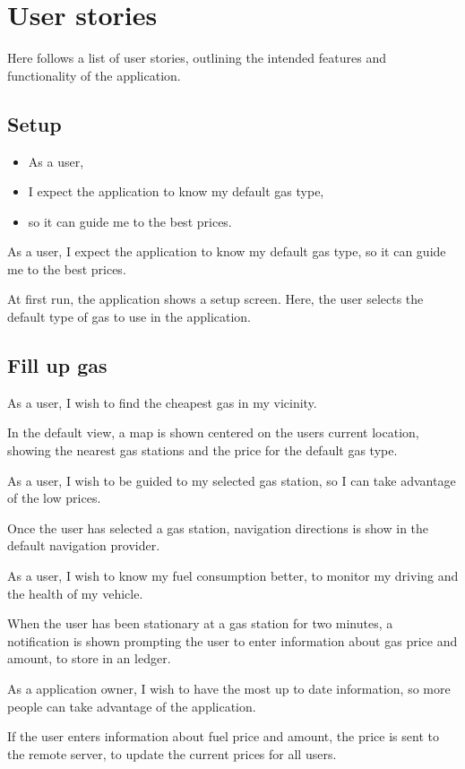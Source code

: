 
\chapter{User stories}
Here follows a list of user stories, outlining the intended features and functionality of the application.

\section{Setup}
\begin{itemize}
	\item As a user,
	\item I expect the application to know my default gas type,
	\item so it can guide me to the best prices.
\end{itemize}
As a user, I expect the application to know my default gas type, so it can guide me to the best prices.

At first run, the application shows a setup screen. Here, the user selects the default type of gas to use in the application.

\section{Fill up gas}
As a user, I wish to find the cheapest gas in my vicinity.

In the default view, a map is shown centered on the users current location, showing the nearest gas stations and the price for the default gas type.

As a user, I wish to be guided to my selected gas station, so I can take advantage of the low prices.

Once the user has selected a gas station, navigation directions is show in the default navigation provider.

As a user, I wish to know my fuel consumption better, to monitor my driving and the health of my vehicle.

When the user has been stationary at a gas station for two minutes, a notification is shown prompting the user to enter information about gas price and amount, to store in an ledger.

As a application owner, I wish to have the most up to date information, so more people can take advantage of the application.

If the user enters information about fuel price and amount, the price is sent to the remote server, to update the current prices for all users.